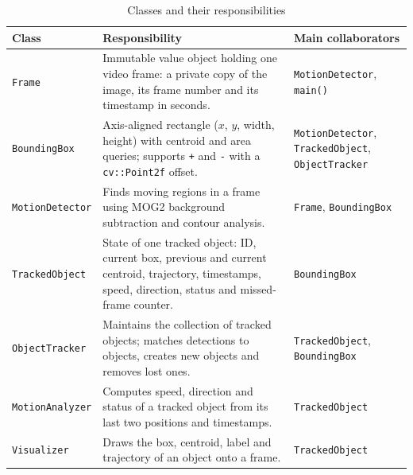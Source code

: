 \documentclass[12pt,a4paper,oneside]{book}
\begin{document}
\begin{table}[H]
\centering
\caption{Classes and their responsibilities}
\label{tab:classes}
\small
\begin{tabular}{@{}p{3.1cm}p{7.2cm}p{4.7cm}@{}}
\toprule
\textbf{Class} & \textbf{Responsibility} & \textbf{Main collaborators}\\
\midrule
\texttt{Frame} & Immutable value object holding one video frame: a private copy of the image, its frame number and its timestamp in seconds. & \texttt{MotionDetector}, \texttt{main()}\\
\texttt{BoundingBox} & Axis-aligned rectangle ($x$, $y$, width, height) with centroid and area queries; supports \texttt{+} and \texttt{-} with a \texttt{cv::Point2f} offset. & \texttt{MotionDetector}, \texttt{TrackedObject}, \texttt{ObjectTracker}\\
\texttt{MotionDetector} & Finds moving regions in a frame using MOG2 background subtraction and contour analysis. & \texttt{Frame}, \texttt{BoundingBox}\\
\texttt{TrackedObject} & State of one tracked object: ID, current box, previous and current centroid, trajectory, timestamps, speed, direction, status and missed-frame counter. & \texttt{BoundingBox}\\
\texttt{ObjectTracker} & Maintains the collection of tracked objects; matches detections to objects, creates new objects and removes lost ones. & \texttt{TrackedObject}, \texttt{BoundingBox}\\
\texttt{MotionAnalyzer} & Computes speed, direction and status of a tracked object from its last two positions and timestamps. & \texttt{TrackedObject}\\
\texttt{Visualizer} & Draws the box, centroid, label and trajectory of an object onto a frame. & \texttt{TrackedObject}\\
\bottomrule
\end{tabular}
\end{table}
\end{document}
